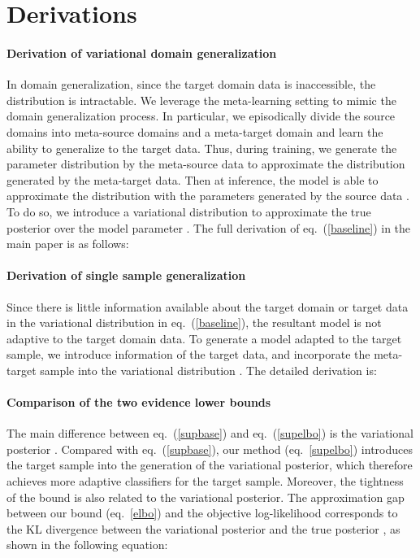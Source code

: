 \documentclass{article} \usepackage[table]{xcolor}
\begin{document}





\newpage
\appendix

\section{Derivations}
\label{app1}

\paragraph{Derivation of variational domain generalization} 
In domain generalization, since the target domain data is inaccessible, the distribution  is intractable.
We leverage the meta-learning setting to mimic the domain generalization process. In particular, we episodically divide the source domains into meta-source domains  and a meta-target domain  and learn the ability to generalize to the target data.
Thus, during training, we generate the parameter distribution by the meta-source data  to approximate the distribution  generated by the meta-target data.
Then at inference, the model is able to approximate the distribution  with the parameters generated by the source data .
To do so, we introduce  a variational distribution  to approximate the true posterior over the model parameter . The full derivation of eq.~(\ref{baseline}) in the main paper is as follows:


\paragraph{Derivation of single sample generalization} Since there is little information available about the target domain or target data in the variational distribution  in eq.~(\ref{baseline}), the resultant model is not adaptive to the target domain data. To generate a model adapted to the target sample, we introduce information of the target data, and incorporate the meta-target sample  into the variational distribution . The detailed derivation is:


\paragraph{Comparison of the two evidence lower bounds}
The main difference between eq.~(\ref{supbase}) and eq.~(\ref{supelbo}) is the variational posterior .
Compared with eq.~(\ref{supbase}), our method (eq.~\ref{supelbo}) introduces the target sample  into the generation of the variational posterior, which therefore achieves more adaptive classifiers for the target sample.
Moreover, the tightness of the bound is also related to the variational posterior.
The approximation gap between our bound (eq.~\ref{elbo}) and the objective log-likelihood corresponds to the KL divergence between the variational posterior  and the true posterior , as shown in the following equation: 
\end{document}
